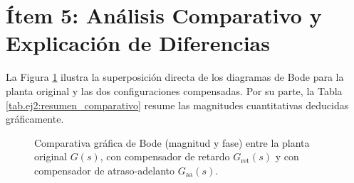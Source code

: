 \clearpage

\section{Ítem 5: Análisis Comparativo y Explicación de Diferencias}

La Figura \ref{fig.ej2:bode_comparativa} ilustra la superposición directa de los diagramas de Bode para la planta original
y las dos configuraciones compensadas. Por su parte, la Tabla \ref{tab.ej2:resumen_comparativo} resume las magnitudes
cuantitativas deducidas gráficamente.

\begin{figure}[!ht]
    \centering
    
    \caption{Comparativa gráfica de Bode (magnitud y fase) entre la planta original $G(s)$, con compensador de retardo $G_{\text{ret}}(s)$ y con compensador de atraso-adelanto $G_{\text{aa}}(s)$.}
    \label{fig.ej2:bode_comparativa}
\end{figure}

